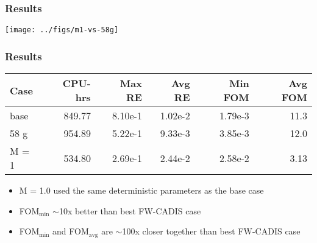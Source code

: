 \documentclass[xcolor=x11names,compress]{beamer}
\renewcommand{\(}{\begin{columns}}
\renewcommand{\)}{\end{columns}}
\newcommand{\<}[1]{\begin{column}{#1}}
\renewcommand{\>}{\end{column}}
\begin{document}
\begin{frame}[fragile]
  \frametitle{Results}
    \begin{center}
  \texttt{[image: ../figs/m1-vs-58g]}  
  \end{center}
\end{frame}

\begin{frame}[fragile]
  \frametitle{Results}

	\begin{table}[p]
 	 \label{tab:comparison}
  	\begin{center}
    \begin{tabular}{|l|r|r|r|r|r|}\hline
      Case & CPU-hrs & Max RE & Avg RE & Min FOM & Avg FOM\\\hline
base & 849.77 & 8.10e-1 & 1.02e-2 & 1.79e-3 & 11.3\\
%
58 g & 954.89 & 5.22e-1 & 9.33e-3 & 3.85e-3 & 12.0\\
%
M = 1 & \alert{534.80} & 2.69e-1 & 2.44e-2 & \alert{2.58e-2} & 3.13\\\hline
    \end{tabular}
 	 \end{center}
	\end{table}

	\begin{itemize}
	\item M = 1.0 used the same deterministic parameters as the base case
	\item FOM$_{\min}$ $\sim$10x better than best FW-CADIS case
	\item FOM$_{\min}$ and FOM$_{\text{avg}}$ are $\sim$100x closer together than best FW-CADIS case
	\end{itemize}

\end{frame}
%
%
\end{document}
